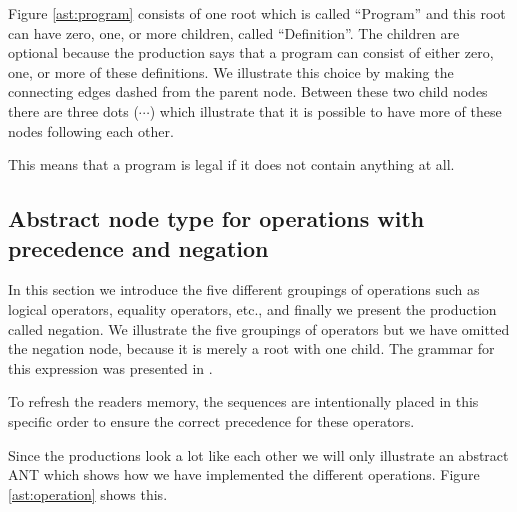 

Figure \ref{ast:program} consists of one root which is called ``Program'' and
this root can have zero, one, or more children, called ``Definition''. The
children are optional because the production says that a program can consist of
either zero, one, or more of these definitions. We illustrate this choice by
making the connecting edges dashed from the parent node. Between these two child
nodes there are three dots ($\cdots$) which illustrate that it is possible to
have more of these nodes following each other.

This means that a program is legal if it does not contain anything at all.

\subsection{Abstract node type for operations with precedence and negation}
In this section we introduce the five different groupings of operations such as
logical operators, equality operators, etc., and finally we present the
production called negation. We illustrate the five groupings of operators but we
have omitted the negation node, because it is merely a root with one child. The
grammar for this expression was presented in .


To refresh the readers memory, the sequences are intentionally placed in this
specific order to ensure the correct precedence for these operators.

Since the productions look a lot like each other we will only illustrate an
abstract ANT which shows how we have implemented the different operations.
Figure \ref{ast:operation} shows this.



